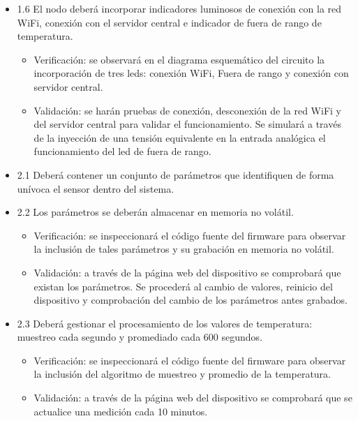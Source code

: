 \documentclass[11pt]{proyecto}
\begin{document}
\begin{itemize}
\item 1.6 El nodo deberá incorporar indicadores luminosos de conexión con la red WiFi, conexión con el servidor central e indicador de fuera de rango de temperatura.

\begin{itemize}
\item Verificación: se observará en el diagrama esquemático del circuito la incorporación de tres leds: conexión WiFi, Fuera de rango y conexión con servidor central.
\item Validación: se harán pruebas de conexión, desconexión de la red WiFi y del servidor central para validar el funcionamiento. Se simulará a través de la inyección de una tensión equivalente en la entrada analógica el funcionamiento del led de fuera de rango.
\end{itemize}

\item 2.1 Deberá contener un conjunto de parámetros que identifiquen de forma unívoca el sensor dentro del sistema.
\item 2.2 Los parámetros se deberán almacenar en memoria no volátil.


\begin{itemize}
\item Verificación: se inspeccionará el código fuente del firmware para observar la inclusión de tales parámetros y su grabación en memoria no volátil.
\item Validación: a través de la página web del dispositivo se comprobará que existan los parámetros. Se procederá al cambio de valores, reinicio del dispositivo y comprobación del cambio de los parámetros antes grabados.
\end{itemize}

\item 2.3 Deberá gestionar el procesamiento de los valores de temperatura: muestreo cada segundo y promediado cada 600 segundos.
\begin{itemize}
\item Verificación: se inspeccionará el código fuente del firmware para observar la inclusión del algoritmo de muestreo y promedio de la temperatura.
\item Validación: a través de la página web del dispositivo se comprobará que se actualice una medición cada 10 minutos.
\end{itemize}


\end{itemize}
\end{document}
